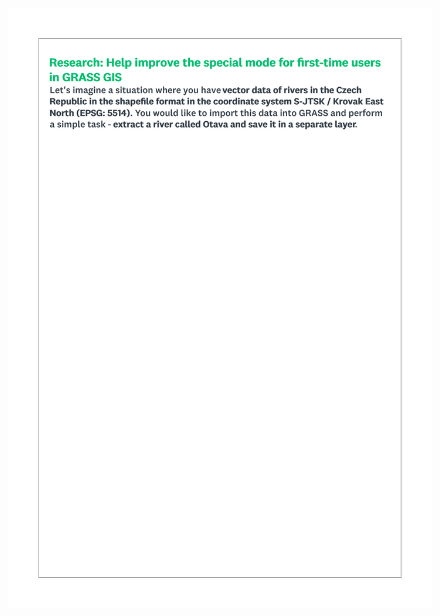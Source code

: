 \documentclass[a4paper,10pt,twoside]{article}
\begin{document}
 \newpage
 \begin{figure}[hbt!]
 \begin{center}
 \includegraphics[width=15.5cm]{../surveys/questionnaires/survey2-page2_task.pdf}
 \end{center}
 \end{figure}
 
\end{document}
